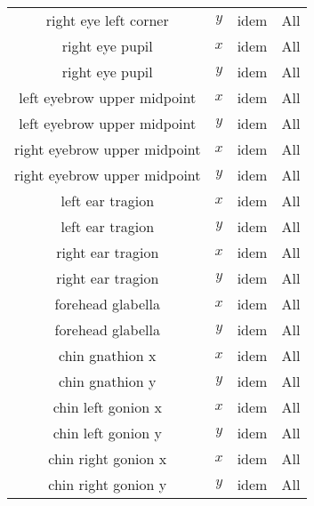 \begin{table}[h]
\begin{tabular}{|c|c|c|c|}
      right eye left corner    & $y$ & idem & All \\
      right eye pupil          & $x$ & idem & All \\
      right eye pupil          & $y$ & idem & All \\
      left eyebrow upper midpoint & $x$ & idem & All \\
      left eyebrow upper midpoint & $y$ & idem & All \\
      right eyebrow upper midpoint & $x$ & idem & All \\
      right eyebrow upper midpoint & $y$ & idem & All \\
      left ear tragion            & $x$ & idem & All \\
      left ear tragion             & $y$ & idem & All \\
      right ear tragion    	 & $x$ & idem & All \\
      right ear tragion            & $y$ & idem & All \\
      forehead glabella         & $x$ & idem & All \\
      forehead glabella            & $y$ & idem & All \\
      chin gnathion x          & $x$ & idem & All \\
      chin gnathion y             & $y$ & idem & All \\
      chin left gonion x      & $x$ & idem & All \\
      chin left gonion y         & $y$ & idem & All \\
      chin right gonion x    & $x$ & idem & All \\
      chin right gonion y       & $y$ & idem & All \\
\end{tabular}
\end{table}
